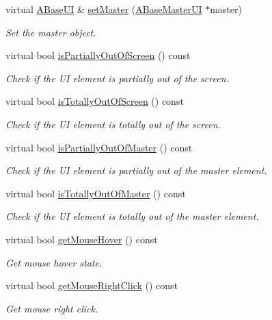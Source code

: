 \begin{DoxyCompactItemize}
virtual \hyperlink{class_a_base_u_i}{A\+Base\+UI} \& \hyperlink{class_a_base_u_i_a258f301b41ab8cc9e1b50ca38c27ca78}{set\+Master} (\hyperlink{class_a_base_master_u_i}{A\+Base\+Master\+UI} $\ast$master)
\begin{DoxyCompactList}\small\item\em Set the master object. \end{DoxyCompactList}\item 
virtual bool \hyperlink{class_a_base_u_i_af83c894a28e16ae8c008da87a617e8fd}{is\+Partially\+Out\+Of\+Screen} () const
\begin{DoxyCompactList}\small\item\em Check if the UI element is partially out of the screen. \end{DoxyCompactList}\item 
virtual bool \hyperlink{class_a_base_u_i_a43ccdbcb5f1e7292cd013c2d1ba3704c}{is\+Totally\+Out\+Of\+Screen} () const
\begin{DoxyCompactList}\small\item\em Check if the UI element is totally out of the screen. \end{DoxyCompactList}\item 
virtual bool \hyperlink{class_a_base_u_i_a3745c95d49ee0c0fc3495f9125c18dd5}{is\+Partially\+Out\+Of\+Master} () const
\begin{DoxyCompactList}\small\item\em Check if the UI element is partially out of the master element. \end{DoxyCompactList}\item 
virtual bool \hyperlink{class_a_base_u_i_af6f2b33f73f32b6fbc02297e439b320a}{is\+Totally\+Out\+Of\+Master} () const
\begin{DoxyCompactList}\small\item\em Check if the UI element is totally out of the master element. \end{DoxyCompactList}\item 
virtual bool \hyperlink{class_a_base_u_i_a0fcf09799934ef6d86a62b266020757a}{get\+Mouse\+Hover} () const
\begin{DoxyCompactList}\small\item\em Get mouse hover state. \end{DoxyCompactList}\item 
virtual bool \hyperlink{class_a_base_u_i_aaf2a90f2fd6bab0439b5437c7c0b1d27}{get\+Mouse\+Right\+Click} () const
\begin{DoxyCompactList}\small\item\em Get mouse right click. \end{DoxyCompactList}\item 

\end{DoxyCompactItemize}
